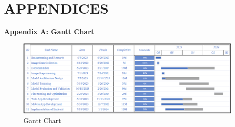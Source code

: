 \section{APPENDICES}
\textbf{Appendix A: Gantt Chart }
\begin{figure}[h]
    \centering
    \includegraphics[width= 6.3in ]{img/ganntchatt.png}
    \caption{Gantt Chart}
\end{figure}